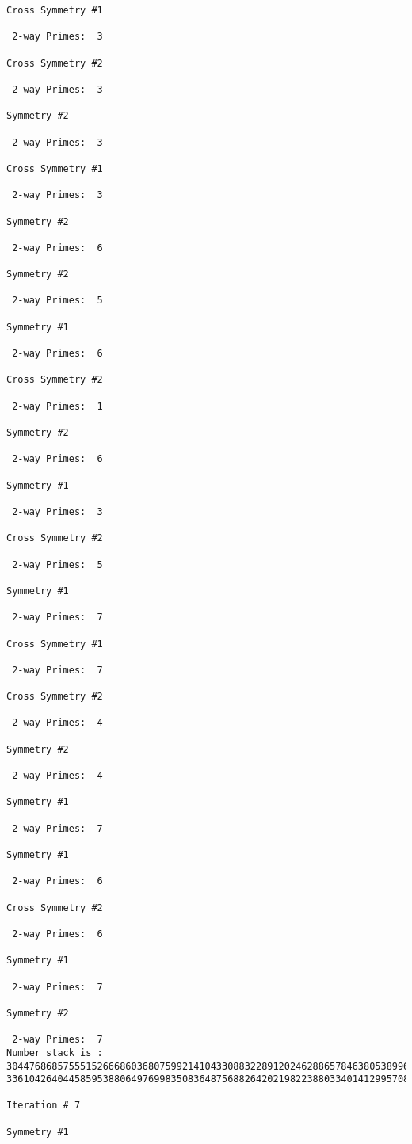 {{{{\begin{verbatim}
Cross Symmetry #1

 2-way Primes: 	3

Cross Symmetry #2

 2-way Primes: 	3

Symmetry #2

 2-way Primes: 	3

Cross Symmetry #1

 2-way Primes: 	3

Symmetry #2

 2-way Primes: 	6

Symmetry #2

 2-way Primes: 	5

Symmetry #1

 2-way Primes: 	6

Cross Symmetry #2

 2-way Primes: 	1

Symmetry #2

 2-way Primes: 	6

Symmetry #1

 2-way Primes: 	3

Cross Symmetry #2

 2-way Primes: 	5

Symmetry #1

 2-way Primes: 	7

Cross Symmetry #1

 2-way Primes: 	7

Cross Symmetry #2

 2-way Primes: 	4

Symmetry #2

 2-way Primes: 	4

Symmetry #1

 2-way Primes: 	7

Symmetry #1

 2-way Primes: 	6

Cross Symmetry #2

 2-way Primes: 	6

Symmetry #1

 2-way Primes: 	7

Symmetry #2

 2-way Primes: 	7
Number stack is :
30447686857555152666860368075992141043308832289120246288657846380538996794608835958544046240163340857
33610426404458595388064976998350836487568826420219822388033401412995708630686662515557586867440375804

Iteration #	7

Symmetry #1


\end{verbatim}}}}}
